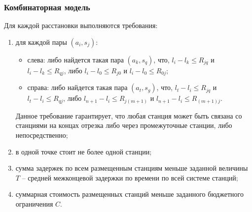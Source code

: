 \begin{frame}
    \frametitle{Комбинаторная модель}
    \justifying
    Для каждой расстановки выполняются требования:

    \begin{enumerate}
        \item  для каждой пары $(a_i,s_j)$:
            \begin{itemize}
                \item слева: либо найдется такая пара $(a_k,s_q)$, что, $l_i - l_k \leqslant R_{jq}$  и $l_i - l_k  \leqslant R_{qj}$, либо $l_i-l_0 \leqslant R_{j0}$ и $l_i - l_0 \leqslant R_{0j}$;
                \item справа: либо найдется такая пара $(a_t,s_g)$, что, $l_t-l_i \leqslant R_{jq}$ и $l_t - l_i \leqslant R_{qj}$, либо $l_{n+1}-l_i \leqslant R_{j(m+1)}$ и $l_{n+1}-l_i \leqslant R_{(m+1)j}$. 
            \end{itemize}
    Данное требование гарантирует, что любая станция может быть связана со станциями на концах отрезка либо через промежуточные станции, либо непосредственно;
        \item в одной точке стоит не более одной станции;
        \item сумма задержек по всем размещенным станциям меньше заданной величины $T$ – средней межконцевой задержки по времени по всей системе станций;
        \item суммарная стоимость размещенных станций меньше заданного бюджетного ограничения  $C$.
    \end{enumerate}

\end{frame}

